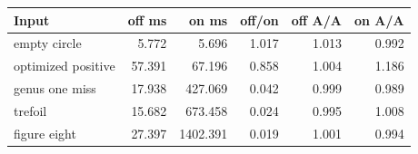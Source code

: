 \begin{center}
\small
\begin{tabular}{lrrrrr}
\toprule
Input & off ms & on ms & off/on & off A/A & on A/A\\
\midrule
empty circle & 5.772 & 5.696 & 1.017 & 1.013 & 0.992\\
optimized positive & 57.391 & 67.196 & 0.858 & 1.004 & 1.186\\
genus one miss & 17.938 & 427.069 & 0.042 & 0.999 & 0.989\\
trefoil & 15.682 & 673.458 & 0.024 & 0.995 & 1.008\\
figure eight & 27.397 & 1402.391 & 0.019 & 1.001 & 0.994\\
\bottomrule
\end{tabular}
\end{center}
